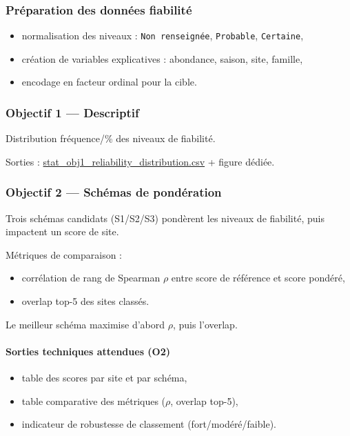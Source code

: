 \documentclass[11pt,a4paper]{article}
\begin{document}
\subsubsection{Préparation des données fiabilité}
\begin{itemize}[leftmargin=1.2cm]
  \item normalisation des niveaux : \texttt{Non renseignée}, \texttt{Probable}, \texttt{Certaine},
  \item création de variables explicatives : abondance, saison, site, famille,
  \item encodage en facteur ordinal pour la cible.
\end{itemize}

\subsubsection{Objectif 1 --- Descriptif}
Distribution fréquence/\% des niveaux de fiabilité.

Sorties : \url{stat_obj1_reliability_distribution.csv} + figure dédiée.

\subsubsection{Objectif 2 --- Schémas de pondération}
Trois schémas candidats (S1/S2/S3) pondèrent les niveaux de fiabilité,
puis impactent un score de site.

Métriques de comparaison :
\begin{itemize}[leftmargin=1.2cm]
  \item corrélation de rang de Spearman $\rho$ entre score de référence et score pondéré,
  \item overlap top-5 des sites classés.
\end{itemize}
Le meilleur schéma maximise d'abord $\rho$, puis l'overlap.

\paragraph{Sorties techniques attendues (O2)}
\begin{itemize}[leftmargin=1.2cm]
  \item table des scores par site et par schéma,
  \item table comparative des métriques ($\rho$, overlap top-5),
  \item indicateur de robustesse de classement (fort/modéré/faible).
\end{itemize}
\end{document}

